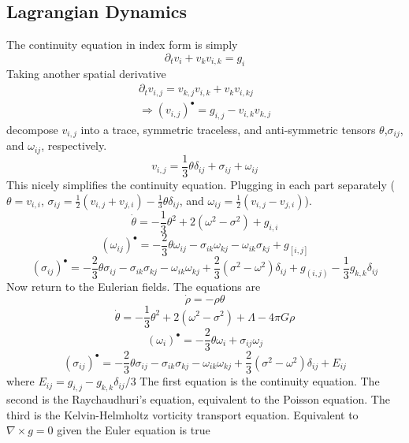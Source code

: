 \subsection{Lagrangian Dynamics}
The continuity equation in index form is simply
\begin{equation}
	\partial_t v_i + v_k v_{i,k} = g_i
\end{equation}
Taking another spatial derivative
\begin{equation}
	\begin{split}
		\partial_t v_{i,j} = v_{k,j}v_{i,k} + v_k v_{i,kj} \\
		\Rightarrow (v_{i,j})^{\bullet} = g_{i,j} - v_{i,k}v_{k,j}
	\end{split}
\end{equation}
decompose $v_{i,j}$ into a trace, symmetric traceless, and anti-symmetric tensors $\theta$,$\sigma_{ij}$, and $\omega_{ij}$, respectively.
\begin{equation}
	v_{i,j} = \frac{1}{3}\theta\delta_{ij} + \sigma_{ij} + \omega_{ij}
\end{equation}
This nicely simplifies the continuity equation. Plugging in each part separately ($\theta = v_{i,i}$, $\sigma_{ij} = \frac{1}{2}(v_{i,j}+v_{j,i}) - \frac{1}{3}\theta\delta_{ij}$, and $\omega_{ij}=\frac{1}{2}(v_{i,j}-v_{j,i})$).
\begin{equation}
	\dot\theta = -\frac{1}{3}\theta^2 + 2(\omega^2 - \sigma^2) + g_{i,i}
\end{equation}
\begin{equation}
	(\omega_{ij})^{\bullet} = -\frac{2}{3}\theta\omega_{ij} - \sigma_{ik}\omega_{kj} - \omega_{ik}\sigma_{kj} + g_{[i,j]}
\end{equation}
\begin{equation}
	(\sigma_{ij})^{\bullet} = -\frac{2}{3}\theta\sigma_{ij} - \sigma_{ik}\sigma_{kj} - \omega_{ik}\omega_{kj} + \frac{2}{3}(\sigma^2-\omega^2)\delta_{ij} + g_{(i,j)} - \frac{1}{3}g_{k,k}\delta_{ij}
\end{equation}
Now return to the Eulerian fields. The equations are
\begin{equation}
	\dot\rho = -\rho\theta
\end{equation}
\begin{equation}
	\dot\theta = -\frac{1}{3}\theta^2 + 2(\omega^2 - \sigma^2) + \Lambda - 4\pi G\rho
\end{equation}
\begin{equation}
	(\omega_{i})^{\bullet} = -\frac{2}{3}\theta\omega_{i} + \sigma_{ij}\omega_j
\end{equation}
\begin{equation}
	(\sigma_{ij})^{\bullet} = -\frac{2}{3}\theta\sigma_{ij} - \sigma_{ik}\sigma_{kj} - \omega_{ik}\omega_{kj} + \frac{2}{3}(\sigma^2-\omega^2)\delta_{ij} + E_{ij}
\end{equation}
where $E_{ij} = g_{i,j} - g_{k,k}\delta_{ij}/3$
The first equation is the continuity equation. The second is the Raychaudhuri's equation, equivalent to the Poisson equation. The third is the Kelvin-Helmholtz vorticity transport equation. Equivalent to $\nabla\times g = 0$ given the Euler equation is true
